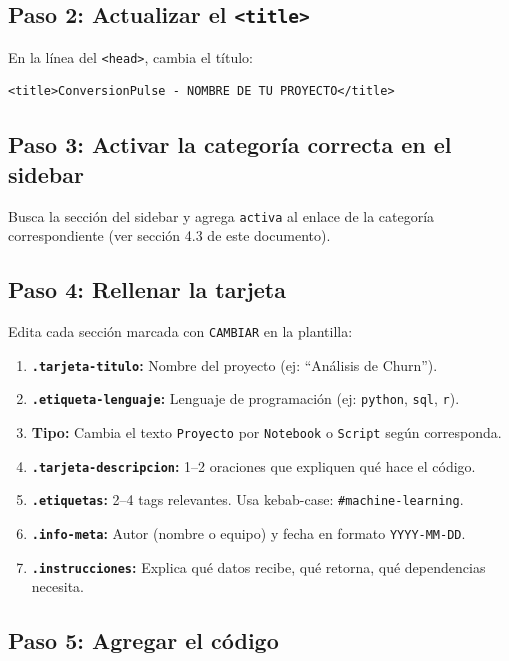 \documentclass[12pt, a4paper]{article}
\newcommand{\clase}[1]{\texttt{\textcolor{cpAzul}{.#1}}}
\newcommand{\etiquetaHtml}[1]{\texttt{\textcolor{cpKeyword}{<#1>}}}
\begin{document}
\subsection{Paso 2: Actualizar el \texttt{<title>}}

En la línea del \etiquetaHtml{head}, cambia el título:

\begin{lstlisting}[style=htmlstyle]
<title>ConversionPulse - NOMBRE DE TU PROYECTO</title>
\end{lstlisting}

\subsection{Paso 3: Activar la categoría correcta en el sidebar}

Busca la sección del sidebar y agrega \texttt{activa} al enlace de la categoría
correspondiente (ver sección 4.3 de este documento).

\subsection{Paso 4: Rellenar la tarjeta}

Edita cada sección marcada con \texttt{CAMBIAR} en la plantilla:

\begin{enumerate}[leftmargin=1.5em]
    \item \textbf{\clase{tarjeta-titulo}:} Nombre del proyecto (ej: ``Análisis de Churn'').
    \item \textbf{\clase{etiqueta-lenguaje}:} Lenguaje de programación (ej: \texttt{python}, \texttt{sql}, \texttt{r}).
    \item \textbf{Tipo:} Cambia el texto \texttt{Proyecto} por \texttt{Notebook} o \texttt{Script} según corresponda.
    \item \textbf{\clase{tarjeta-descripcion}:} 1--2 oraciones que expliquen qué hace el código.
    \item \textbf{\clase{etiquetas}:} 2--4 tags relevantes. Usa kebab-case: \texttt{\#machine-learning}.
    \item \textbf{\clase{info-meta}:} Autor (nombre o equipo) y fecha en formato \texttt{YYYY-MM-DD}.
    \item \textbf{\clase{instrucciones}:} Explica qué datos recibe, qué retorna, qué dependencias necesita.
\end{enumerate}

\subsection{Paso 5: Agregar el código}
\end{document}
